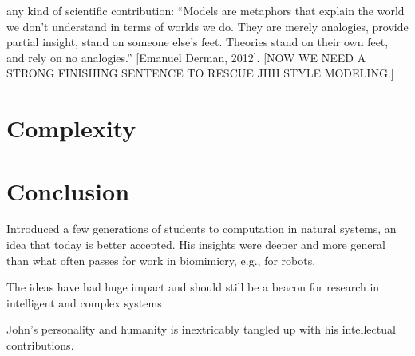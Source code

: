\documentclass{sig-alternate}
\begin{document}
any kind of scientific contribution:  “Models are metaphors that explain the world we don’t understand in terms of worlds we do.  They are merely analogies, provide partial insight, stand on someone else’s feet.  Theories stand on their own feet, and rely on no analogies.”  [Emanuel Derman, 2012].  [NOW WE NEED A STRONG FINISHING SENTENCE TO RESCUE JHH STYLE MODELING.]



\section{Complexity}

\section{Conclusion}

Introduced a few generations of students to computation in natural systems, an idea that today is better accepted.  His insights were deeper and more general than what often passes for work in biomimicry, e.g., for robots.

The ideas have had huge impact and should still be a beacon for research in intelligent and complex systems

John's personality and humanity is inextricably tangled up with his intellectual contributions.
\end{document}

